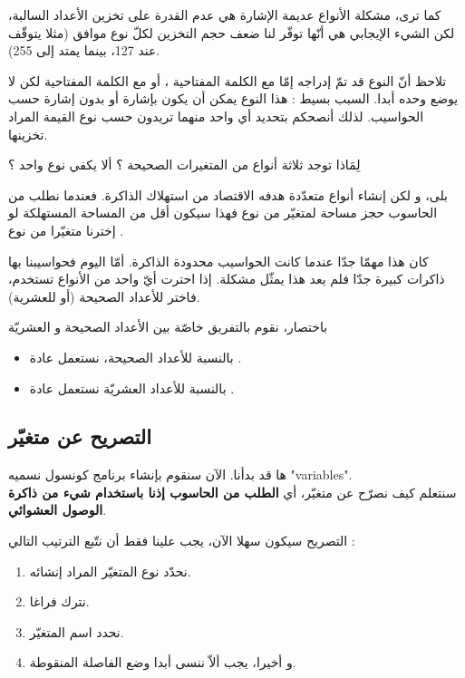 كما ترى، مشكلة الأنواع عديمة الإشارة هي عدم القدرة على تخزين الأعداد السالبة، لكن الشيء الإيجابي هي أنّها توفّر لنا ضعف حجم التخزين لكلّ نوع موافق (مثلا
يتوقّف عند 127، بينما
يمتد إلى 255).

\begin{information}
  تلاحظ أنّ النوع
قد تمّ إدراجه إمّا مع الكلمة المفتاحية
،
أو مع الكلمة المفتاحية
لكن لا يوضع وحده أبدا. السبب بسيط : هذا النوع يمكن أن يكون بإشارة أو بدون إشارة حسب الحواسيب. لذلك أنصحكم بتحديد أي واحد منهما تريدون حسب نوع القيمة المراد تخزينها.
\end{information}

\begin{question}
  لِمَاذا توجد ثلاثة أنواع من المتغيرات الصحيحة ؟ ألا يكفي نوع واحد ؟
\end{question}

بلى، و لكن إنشاء أنواع متعدّدة هدفه الاقتصاد من استهلاك الذاكرة. فعندما نطلب من الحاسوب حجز مساحة لمتغيّر من نوع
فهذا سيكون أقل من المساحة المستهلكة لو إخترنا متغيّرا من نوع
.

كان هذا مهمّا جدّا عندما كانت الحواسيب محدودة الذاكرة. أمّا اليوم فحواسيبنا بها ذاكرات كبيرة جدّا فلم يعد هذا يمثّل مشكلة. إذا احترت أيّ واحد من الأنواع تستخدم، فاختر
للأعداد الصحيحة (أو
للعشرية).

باختصار، نقوم بالتفريق خاصّة بين الأعداد الصحيحة و العشريّة
\begin{itemize}
  \item بالنسبة للأعداد الصحيحة، نستعمل عادة
.
  \item بالنسبة للأعداد العشريّة نستعمل عادة
.
\end{itemize}

\subsection{التصريح عن متغيّر}
ها قد بدأنا. الآن سنقوم بإنشاء برنامج كونسول نسميه "\textenglish{variables}".\\
 سنتعلم كيف نصرّح عن متغيّر، أي
 \textbf{الطلب من الحاسوب إذنا باستخدام شيء من ذاكرة الوصول العشوائي}.

 التصريح سيكون سهلا الآن، يجب علينا فقط أن نتّبع الترتيب التالي :
 
 \begin{enumerate}
   \item نحدّد نوع المتغيّر المراد إنشائه.
   \item نترك فراغا.
   \item نحدد اسم المتغيّر.
   \item و أخيرا، يجب ألاّ ننسى أبدا وضع الفاصلة المنقوطة.
 \end{enumerate}

